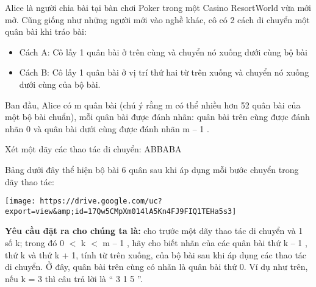 Alice là người chia bài tại bàn chơi Poker trong một Casino ResortWorld vừa mới mở. Cũng giống như những người mới vào nghề khác, cô có 2 cách di chuyển một quân bài khi tráo bài:
\begin{itemize}
	\item Cách A: Cô lấy 1 quân bài ở trên cùng và chuyển nó xuống dưới cùng bộ bài
	\item Cách B: Cô lấy 1 quân bài ở vị trí thứ hai từ trên xuống và chuyển nó xuống dưới cùng của bộ bài.
\end{itemize}

Ban đầu, Alice có m quân bài (chú ý rằng m có thể nhiều hơn 52 quân bài của một bộ bài chuẩn), mỗi quân bài được đánh nhãn: quân bài trên cùng được đánh nhãn 0 và quân bài dưới cùng được đánh nhãn m – 1 .

Xét một dãy các thao tác di chuyển: ABBABA

Bảng dưới đây thể hiện bộ bài 6 quân sau khi áp dụng mỗi bước chuyển trong dãy thao tác:


\texttt{[image: https://drive.google.com/uc?export=view\&amp;id=17Qw5CMpXm014lA5Kn4FJ9FIQ1TEHa5s3]}

\textbf{Yêu cầu đặt ra cho chúng ta là: } cho trước một dãy thao tác di chuyển và 1 số k; trong đó 0 $<$ k $<$ m – 1 , hãy cho biết nhãn của các quân bài thứ k – 1 , thứ k và thứ k + 1, tính từ trên xuống, của bộ bài sau khi áp dụng các thao tác di chuyển. Ở đây, quân bài trên cùng có nhãn là quân bài thứ 0. Ví dụ như trên, nếu k = 3 thì câu trả lời là “ 3 1 5 ”.